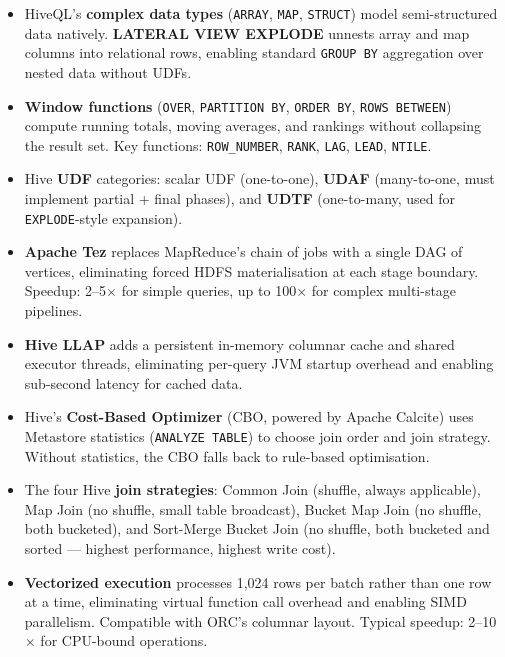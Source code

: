 \begin{itemize}
  \item HiveQL's \textbf{complex data types} (\texttt{ARRAY}, \texttt{MAP},
        \texttt{STRUCT}) model semi-structured data natively.
        \textbf{LATERAL VIEW EXPLODE} unnests array and map columns into
        relational rows, enabling standard \texttt{GROUP BY} aggregation
        over nested data without UDFs.

  \item \textbf{Window functions} (\texttt{OVER}, \texttt{PARTITION BY},
        \texttt{ORDER BY}, \texttt{ROWS BETWEEN}) compute running totals,
        moving averages, and rankings without collapsing the result set.
        Key functions: \texttt{ROW\_NUMBER}, \texttt{RANK},
        \texttt{LAG}, \texttt{LEAD}, \texttt{NTILE}.

  \item Hive \textbf{UDF} categories: scalar UDF (one-to-one),
        \textbf{UDAF} (many-to-one, must implement partial + final phases),
        and \textbf{UDTF} (one-to-many, used for \texttt{EXPLODE}-style
        expansion).

  \item \textbf{Apache Tez} replaces MapReduce's chain of jobs with a
        single DAG of vertices, eliminating forced HDFS materialisation
        at each stage boundary. Speedup: 2--5$\times$ for simple queries,
        up to 100$\times$ for complex multi-stage pipelines.

  \item \textbf{Hive LLAP} adds a persistent in-memory columnar cache
        and shared executor threads, eliminating per-query JVM startup
        overhead and enabling sub-second latency for cached data.

  \item Hive's \textbf{Cost-Based Optimizer} (CBO, powered by Apache
        Calcite) uses Metastore statistics (\texttt{ANALYZE TABLE}) to
        choose join order and join strategy. Without statistics, the CBO
        falls back to rule-based optimisation.

  \item The four Hive \textbf{join strategies}: Common Join (shuffle,
        always applicable), Map Join (no shuffle, small table broadcast),
        Bucket Map Join (no shuffle, both bucketed), and Sort-Merge Bucket
        Join (no shuffle, both bucketed and sorted --- highest performance,
        highest write cost).

  \item \textbf{Vectorized execution} processes 1{,}024 rows per batch
        rather than one row at a time, eliminating virtual function call
        overhead and enabling SIMD parallelism. Compatible with ORC's
        columnar layout. Typical speedup: 2--10$\times$ for CPU-bound
        operations.


\end{itemize}
